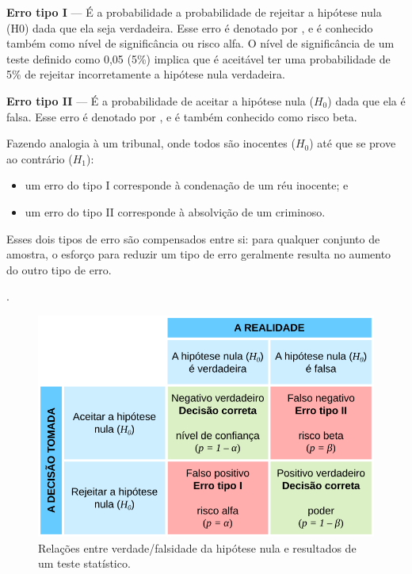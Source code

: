 \documentclass[
]{book}
\begin{document}
\textbf{Erro tipo I} --- É a probabilidade a probabilidade de rejeitar a hipótese nula (H0) dada que ela seja verdadeira. Esse erro é denotado por \alpha, e é conhecido também como nível de significância ou risco alfa.
O nível de significância de um teste definido como 0,05 (5\%) implica que é aceitável ter uma probabilidade de 5\% de rejeitar incorretamente a hipótese nula verdadeira.

\textbf{Erro tipo II} --- É a probabilidade de aceitar a hipótese nula (\(H_0\)) dada que ela é falsa. Esse erro é denotado por \beta, e é também conhecido como risco beta.

Fazendo analogia à um tribunal, onde todos são inocentes (\(H_0\)) até que se prove ao contrário (\(H_1\)):

\begin{itemize}
\item
  um erro do tipo I corresponde à condenação de um réu inocente; e
\item
  um erro do tipo II corresponde à absolvição de um criminoso.
\end{itemize}

Esses dois tipos de erro são compensados entre si: para qualquer conjunto de amostra, o esforço para reduzir um tipo de erro geralmente resulta no aumento do outro tipo de erro.

.\linebreak

\begin{figure}

{\centering \includegraphics[width=600px]{figs/erro_estatistico} 

}

\caption{Relações entre verdade/falsidade da hipótese nula e resultados de um teste statístico.}\label{fig:errostipos}
\end{figure}
\end{document}

